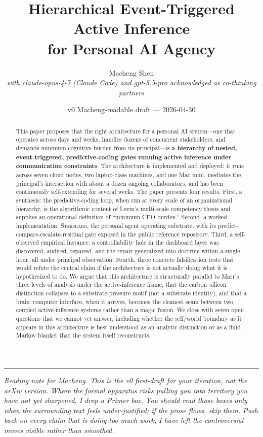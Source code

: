 \documentclass[11pt]{article}
\title{Hierarchical Event-Triggered Active Inference\\
\large for Personal AI Agency}
\author{Macheng Shen\\\textit{with claude-opus-4-7 (Claude Code) and gpt-5.5-pro acknowledged as co-thinking partners}}
\date{v0 Macheng-readable draft — 2026-04-30}
\begin{document}
\maketitle

\begin{abstract}
\noindent
This paper proposes that the right architecture for a personal AI system---one that operates across days and weeks, handles dozens of concurrent stakeholders, and demands minimum cognitive burden from its principal---is \textbf{a hierarchy of nested, event-triggered, predictive-coding gates running active inference under communication constraints}. The architecture is implemented and deployed: it runs across seven cloud nodes, two laptop-class machines, and one Mac mini, mediates the principal's interaction with about a dozen ongoing collaborators, and has been continuously self-extending for several weeks. The paper presents four results. First, a synthesis: the predictive-coding loop, when run at every scale of an organizational hierarchy, is the algorithmic content of Levin's multi-scale competency thesis and supplies an operational definition of ``minimum CEO burden.'' Second, a worked implementation: \textsc{Starshard}, the personal agent operating substrate, with its predict-compare-escalate-residual gate exposed in the public reference repository. Third, a self-observed empirical instance: a controllability hole in the dashboard layer was discovered, audited, repaired, and the repair generalized into doctrine within a single hour, all under principal observation. Fourth, three concrete falsification tests that would refute the central claim if the architecture is not actually doing what it is hypothesized to do. We argue that this architecture is structurally parallel to Marr's three levels of analysis under the active-inference frame, that the carbon--silicon distinction collapses to a substrate-pressure motif (not a substrate identity), and that a brain--computer interface, when it arrives, becomes the cleanest seam between two coupled active-inference systems rather than a magic fusion. We close with seven open questions that we cannot yet answer, including whether the self/world boundary as it appears in this architecture is best understood as an analytic distinction or as a fluid Markov blanket that the system itself reconstructs.
\end{abstract}

\hrule
\medskip

\noindent\textit{Reading note for Macheng. This is the v0 first-draft for your iteration, not the arXiv version. Where the formal apparatus risks pulling you into territory you have not yet sharpened, I drop a Primer box. You should read those boxes only when the surrounding text feels under-justified; if the prose flows, skip them. Push back on every claim that is doing too much work; I have left the controversial moves visible rather than smoothed.}
\end{document}

